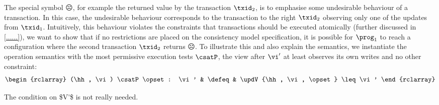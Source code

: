 The special symbol \(\sadface\), for example the returned value by the transaction $\txid_2$, is to emphasise some undesirable behaviour of a transaction.
In this case, the undesirable behaviour corresponds to the transaction to the right \( \txid_{2} \) observing only one of the updates from \( \txid_{1} \). 
Intuitively, this behaviour violates the constraints that transactions should be executed atomically (further discussed in \cref{......}), we want to show that if no restrictions are placed on the consistency model specification, it is possible for $\prog_1$ to reach a configuration where the second transaction $\txid_2$ returns $\sadface$. 
To illustrate this and also explain the semantics, we instantiate the operation semantics with the most permissive execution tests \( \csatP \), \ie the view after \( \vi' \) at least observes its own writes and no other constraint:
\[
\begin{rclarray}
    (\hh, \vi) \csatP \opset : \vi' & \defeq & \updV{\hh, \vi, \opset} \leq \vi'
\end{rclarray}
\]

\ac{The condition on $V'$ is not really needed.}

